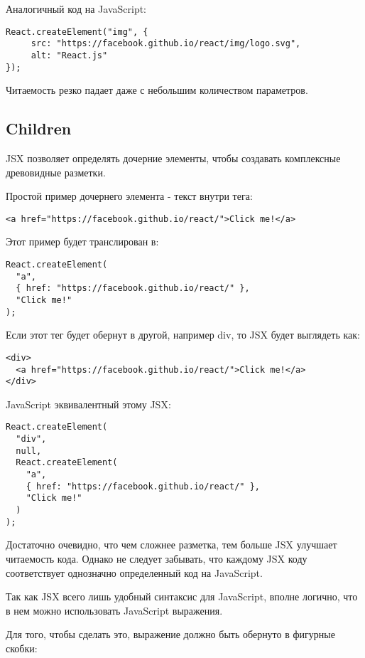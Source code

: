Аналогичный код на JavaScript:

\begin{lstlisting}
React.createElement("img", {
     src: "https://facebook.github.io/react/img/logo.svg",
     alt: "React.js"
});
\end{lstlisting}

Читаемость резко падает даже с небольшим количеством параметров.

\subsection*{Children}

JSX позволяет определять дочерние элементы, чтобы создавать комплексные древовидные разметки.

Простой пример дочернего элемента - текст внутри тега:

\begin{lstlisting}
<a href="https://facebook.github.io/react/">Click me!</a>
\end{lstlisting}

Этот пример будет транслирован в:

\begin{lstlisting}
React.createElement(
  "a",
  { href: "https://facebook.github.io/react/" },
  "Click me!"
);
\end{lstlisting}
   
Если этот тег будет обернут в другой, например div, то JSX будет выглядеть как:

\begin{lstlisting}
<div>
  <a href="https://facebook.github.io/react/">Click me!</a>
</div>
\end{lstlisting}

JavaScript эквивалентный этому JSX:

\begin{lstlisting}
React.createElement(
  "div",
  null,
  React.createElement(
    "a",
    { href: "https://facebook.github.io/react/" },
    "Click me!"
  ) 
);
\end{lstlisting}

Достаточно очевидно, что чем сложнее разметка, тем больше JSX улучшает читаемость кода. Однако не следует забывать, что каждому JSX коду соответствует однозначно определенный код на JavaScript.

Так как JSX всего лишь удобный синтаксис для JavaScript, вполне логично, что в нем можно использовать JavaScript выражения. 

Для того, чтобы сделать это, выражение должно быть обернуто в фигурные скобки:


